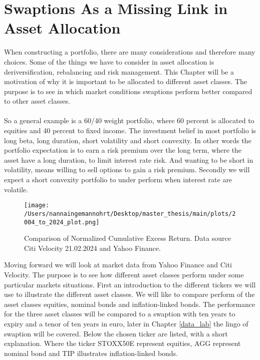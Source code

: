 \section{Swaptions As a Missing Link in Asset Allocation}
When constructing a portfolio, there are many considerations and therefore many choices. 
Some of the things we have to consider in asset allocation is deriversification, rebalancing 
and risk management. This Chapter will be a motivation of why it is important to be 
allocated to different asset classes. The purpose is to see in which market conditions
swaptions perform better compared to other asset classes.
\\\\
So a general  example is a 60/40 weight portfolio, where 60 percent is allocated to equities 
and 40 percent to fixed income. 
The investment belief in most portfolio is long beta, long duration, short volatility and short 
convexity. In other words the portfolio expectation is to earn a risk premium over the long term, 
where the asset have a long duration, to limit interest rate risk. And wanting to be short in
volatility, means willing to sell options to gain a risk premium. Secondly we will expect 
a short convexity portfolio to under perform when interest rate are volatile. 
\begin{figure}[H]
    \centering
    \texttt{[image: /Users/nannaingemannohrt/Desktop/master\_thesis/main/plots/2004\_to\_2024\_plot.png]}
    \caption{Comparison of Normalized Cumulative Excess Return. Data source Citi Velocity 21.02.2024 
    and Yahoo Finance.}
    \label{fig:2004_2024}
\end{figure}
\noindent
Moving forward we will look at market data from Yahoo Finance and Citi Velocity. 
The purpose is to see how different asset classes perform under some particular markets situations.
First an introduction to the different tickers we will use to illustrate the different asset classes. 
We will like to compare perform of the asset classes equities, nominal bonds and inflation-linked bonds. 
The performance for the three asset classes will be compared to a swaption with ten years to expiry and a tenor
of ten years in euro, later in Chapter \ref{data_lab} the lingo of swaption will be covered. 
Below the chosen ticker are listed, with a short explanation. Where the ticker STOXX50E represent equities, 
AGG represent nominal bond and TIP illustrates inflation-linked bonds.

